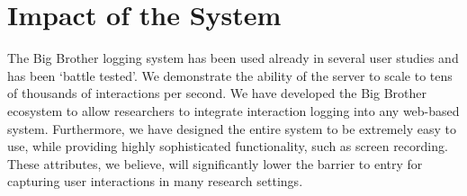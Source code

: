 \vspace{-12pt}
\section{Impact of the System}

The Big Brother logging system has been used already in several user studies and has been `battle tested'. We demonstrate the ability of the \bb server to scale to tens of thousands of interactions per second. We have developed the Big Brother ecosystem to allow researchers to integrate interaction logging into any web-based system. Furthermore, we have designed the entire system to be extremely easy to use, while providing highly sophisticated functionality, such as screen recording. These attributes, we believe, will significantly lower the barrier to entry for capturing user interactions in many research settings.